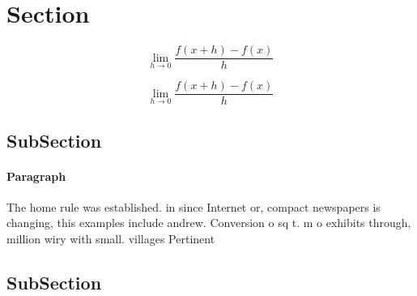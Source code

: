 \documentclass[a4paper]{article}
\begin{document}
\section{Section}

\[\lim_{h \rightarrow 0 } \frac{f(x+h)-f(x)}{h}\]

\[\lim_{h \rightarrow 0 } \frac{f(x+h)-f(x)}{h}\]

\subsection{SubSection}

\paragraph{Paragraph}
The home rule was established. in since Internet or, compact newspapers is changing, this examples include andrew. Conversion o sq t. m o exhibits through, million wiry with small. villages Pertinent


\subsection{SubSection}
\end{document}
